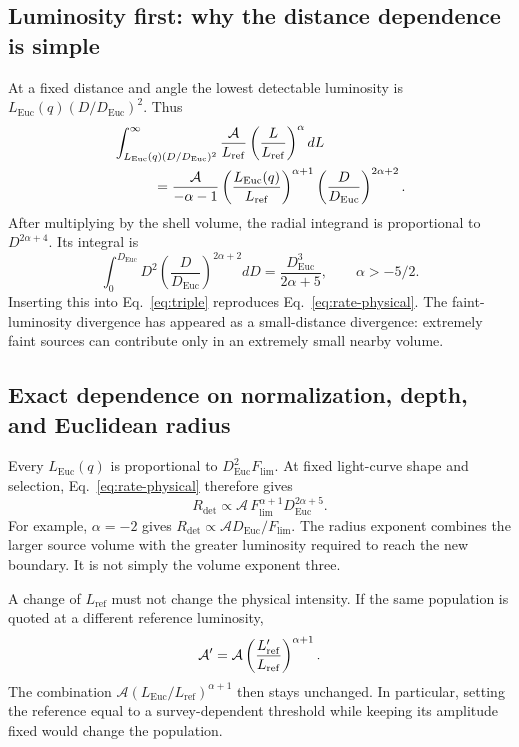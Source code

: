 \documentclass[11pt,a4paper]{article}
\newcommand{\Euc}{\mathrm{Euc}}
\newcommand{\Flim}{F_{\mathrm{lim}}}
\newcommand{\Lref}{L_{\mathrm{ref}}}
\newcommand{\Rdet}{R_{\mathrm{det}}}
\begin{document}
\subsection{Luminosity first: why the distance dependence is simple}
At a fixed distance and angle the lowest detectable luminosity is
$L_\Euc(q)(D/D_\Euc)^2$. Thus
\begin{align}
 &\int_{L_\Euc(q)(D/D_\Euc)^2}^\infty
 \frac{\mathcal A}{\Lref}\left(\frac L{\Lref}\right)^\alpha dL\notag\\
 &\hspace{1cm}=\frac{\mathcal A}{-\alpha-1}
 \left(\frac{L_\Euc(q)}{\Lref}\right)^{\alpha+1}
 \left(\frac D{D_\Euc}\right)^{2\alpha+2}.
 \label{eq:L-first}
\end{align}
After multiplying by the shell volume, the radial integrand is proportional
to $D^{2\alpha+4}$. Its integral is
\begin{equation}
 \int_0^{D_\Euc}D^2\left(\frac D{D_\Euc}\right)^{2\alpha+2}dD
 =\frac{D_\Euc^3}{2\alpha+5},\qquad \alpha>-5/2.
 \label{eq:D-integral}
\end{equation}
Inserting this into Eq.~\eqref{eq:triple} reproduces
Eq.~\eqref{eq:rate-physical}. The faint-luminosity divergence has appeared
as a small-distance divergence: extremely faint sources can contribute only
in an extremely small nearby volume.

\subsection{Exact dependence on normalization, depth, and Euclidean radius}
Every $L_\Euc(q)$ is proportional to $D_\Euc^2\Flim$. At fixed light-curve
shape and selection, Eq.~\eqref{eq:rate-physical} therefore gives
\begin{equation}
 \boxed{\Rdet\propto\mathcal A\,\Flim^{\alpha+1}
 D_\Euc^{2\alpha+5}.}
 \label{eq:scalings}
\end{equation}
For example, $\alpha=-2$ gives $\Rdet\propto\mathcal A D_\Euc/\Flim$.
The radius exponent combines the larger source volume with the greater
luminosity required to reach the new boundary. It is not simply the
volume exponent three.

A change of $\Lref$ must not change the physical intensity. If the same
population is quoted at a different reference luminosity,
\begin{equation}
 \mathcal A'=\mathcal A
 \left(\frac{L_{\rm ref}'}{\Lref}\right)^{\alpha+1}.
 \label{eq:reference}
\end{equation}
The combination $\mathcal A(L_\Euc/\Lref)^{\alpha+1}$ then stays unchanged.
In particular, setting the reference equal to a survey-dependent threshold
while keeping its amplitude fixed would change the population.
\end{document}
